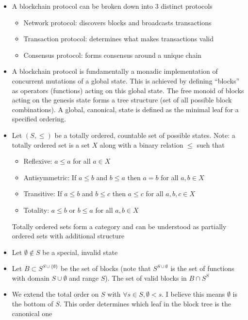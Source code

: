 \documentclass[a4paper]{article}
\begin{document}
\begin{itemize}
\item A blockchain protocol can be broken down into 3 distinct protocols
\begin{itemize}
\item Network protocol: discovers blocks and broadcasts transactions
\item Transaction protocol: determines what makes transactions valid
\item Consensus protocol: forms consensus around a unique chain
\end{itemize}

\item A blockchain protocol is fundamentally a monadic implementation of concurrent mutations of a global state. This is achieved by defining “blocks” as operators (functions) acting on this global state. The free monoid of blocks acting on the genesis state forms a tree structure (set of all possible block combinations). A global, canonical, state is defined as the minimal leaf for a specified ordering.

\item Let $(S, \leq)$ be a totally ordered, countable set of possible states. Note: a totally ordered set is a set $X$ along with a binary relation $\leq$ such that

\begin{itemize}
\item Reflexive: $a \leq a$ for all $a \in X$
\item Antisymmetric: If $a \leq b$ and $b \leq a$ then $a = b$ for all $a,b \in X$
\item Transitive: If $a \leq b$ and $b \leq c$ then $a \leq c$ for all $a,b,c \in X$
\item Totality: $a \leq b$ or $b \leq a$ for all $a, b \in X$
\end{itemize}

Totally ordered sets form a category and can be understood as partially ordered sets with additional structure

\item Let $\emptyset \notin S$ be a special, invalid state

\item Let $B \subset S^{S \cup \{\emptyset\}}$ be the set of blocks (note that $S^{S \cup \emptyset}$ is the set of functions with domain $S \cup \emptyset$ and range $S$). The set of valid blocks in $B \cap S^S$

\item We extend the total order on $S$ with $\forall s \in S, \emptyset < s$. I believe this means $\emptyset$ is the bottom of $S$. This order determines which leaf in the block tree is the canonical one


\end{itemize}
\end{document}
